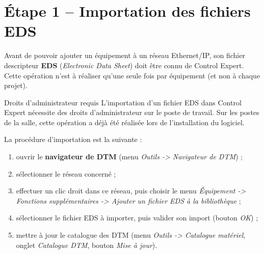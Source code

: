 \section{Étape 1 -- Importation des fichiers EDS}
\label{secEtapeImportEds}

Avant de pouvoir ajouter un équipement à un réseau Ethernet/IP, son fichier
descripteur \textbf{EDS} (\emph{Electronic Data Sheet}) doit être connu de
Control Expert. Cette opération n'est à réaliser qu'une seule fois par
équipement (et non à chaque projet).

\begin{UPSTIwarning}{Droits d'administrateur requis}
L'importation d'un fichier EDS dans Control Expert nécessite des droits
d'administrateur sur le poste de travail. Sur les postes de la salle, cette
opération a déjà été réalisée lors de l'installation du logiciel.
\end{UPSTIwarning}

La procédure d'importation est la suivante :

\begin{enumerate}
    \item ouvrir le \textbf{navigateur de DTM} (menu \emph{Outils ->
    Navigateur de DTM}) ;
    \item sélectionner le réseau concerné ;
    \item effectuer un clic droit dans ce réseau, puis choisir le menu
    \emph{Équipement -> Fonctions supplémentaires -> Ajouter un fichier EDS
    à la bibliothèque} ;
    \item sélectionner le fichier EDS à importer, puis valider son import
    (bouton \emph{OK}) ;
    \item mettre à jour le catalogue des DTM (menu \emph{Outils ->
    Catalogue matériel}, onglet \emph{Catalogue DTM}, bouton \emph{Mise à
    jour}).
\end{enumerate}

